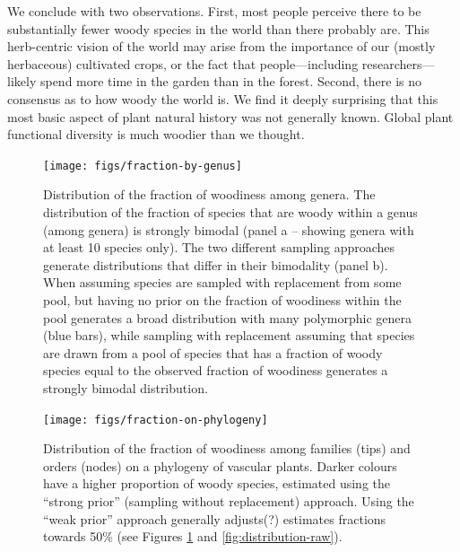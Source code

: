 \documentclass[12pt]{article}
\begin{document}
We conclude with two observations.  
%
First, most people perceive there to be substantially fewer woody
species in the world than there probably are.  This herb-centric
vision of the world may arise from the importance of our (mostly
herbaceous) cultivated crops, or the fact that people---including researchers---likely
spend more time in the garden than in the forest.
%
Second, there is no consensus as to how woody the world is.  We find
it deeply surprising that this most basic aspect of plant natural
history was not generally known.  Global plant functional diversity is
much woodier than we thought.




\begin{figure}[p]
  \centering
  \texttt{[image: figs/fraction-by-genus]}
  \caption{Distribution of the fraction of woodiness among genera.
    The distribution of the fraction of species that are woody within
    a genus (among genera) is strongly bimodal (panel a -- showing
    genera with at least 10 species only).
    The two different sampling approaches generate distributions that
    differ in their bimodality (panel b).  When assuming species are
    sampled with replacement from some pool, but having no prior on
    the fraction of woodiness within the pool generates a broad
    distribution with many polymorphic genera (blue bars), while
    sampling with replacement assuming that species are drawn from a
    pool of species that has a fraction of woody species equal to the
    observed fraction of woodiness generates a strongly bimodal
    distribution.}
  \label{fig:distribution-genera}
\end{figure}

\begin{figure}[p]
  \centering
  \texttt{[image: figs/fraction-on-phylogeny]}
  \caption{Distribution of the fraction of woodiness among families
    (tips) and orders (nodes) on a phylogeny of vascular plants.
    Darker colours have a higher proportion of woody species,
    estimated using the ``strong prior'' (sampling without
    replacement) approach.  Using the ``weak prior'' approach
    generally adjusts(?) estimates fractions towards 50\% (see Figures
    \ref{fig:distribution-genera} and \ref{fig:distribution-raw}).}
\label{fig:phylogeny}
\end{figure}
\end{document}
